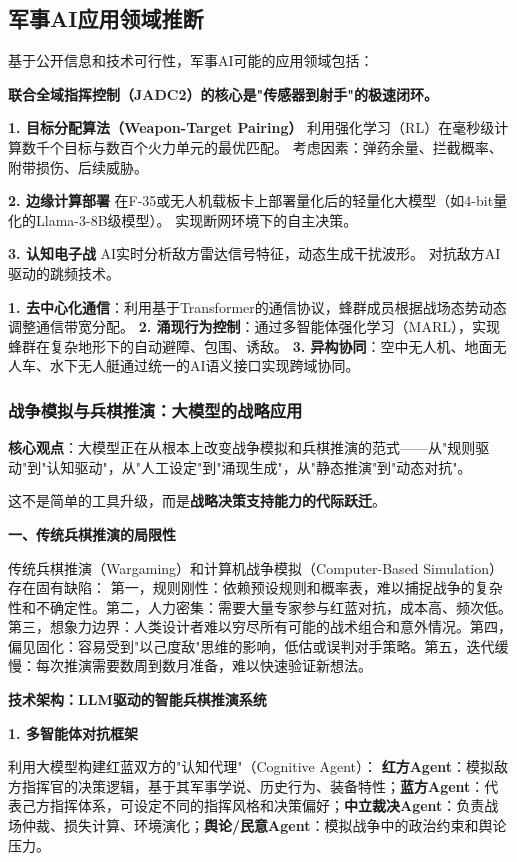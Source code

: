 \subsection{军事AI应用领域推断}

基于公开信息和技术可行性，军事AI可能的应用领域包括：

\textbf{联合全域指挥控制（JADC2）的核心是"传感器到射手"的极速闭环。}

\textbf{1. 目标分配算法（Weapon-Target Pairing）}
利用强化学习（RL）在毫秒级计算数千个目标与数百个火力单元的最优匹配。 考虑因素：弹药余量、拦截概率、附带损伤、后续威胁。

\textbf{2. 边缘计算部署}
在F-35或无人机载板卡上部署量化后的轻量化大模型（如4-bit量化的Llama-3-8B级模型）。 实现断网环境下的自主决策。

\textbf{3. 认知电子战}
AI实时分析敌方雷达信号特征，动态生成干扰波形。 对抗敌方AI驱动的跳频技术。

\textbf{1. 去中心化通信}：利用基于Transformer的通信协议，蜂群成员根据战场态势动态调整通信带宽分配。
\textbf{2. 涌现行为控制}：通过多智能体强化学习（MARL），实现蜂群在复杂地形下的自动避障、包围、诱敌。
\textbf{3. 异构协同}：空中无人机、地面无人车、水下无人艇通过统一的AI语义接口实现跨域协同。

\subsubsection{战争模拟与兵棋推演：大模型的战略应用}

\textbf{核心观点}：大模型正在从根本上改变战争模拟和兵棋推演的范式——从"规则驱动"到"认知驱动"，从"人工设定"到"涌现生成"，从"静态推演"到"动态对抗"。

这不是简单的工具升级，而是\textbf{战略决策支持能力的代际跃迁}。

\textbf{一、传统兵棋推演的局限性}

传统兵棋推演（Wargaming）和计算机战争模拟（Computer-Based Simulation）存在固有缺陷：
第一，规则刚性：依赖预设规则和概率表，难以捕捉战争的复杂性和不确定性。第二，人力密集：需要大量专家参与红蓝对抗，成本高、频次低。第三，想象力边界：人类设计者难以穷尽所有可能的战术组合和意外情况。第四，偏见固化：容易受到"以己度敌"思维的影响，低估或误判对手策略。第五，迭代缓慢：每次推演需要数周到数月准备，难以快速验证新想法。

\textbf{技术架构：LLM驱动的智能兵棋推演系统}

\textbf{1. 多智能体对抗框架}

利用大模型构建红蓝双方的"认知代理"（Cognitive Agent）：
\textbf{红方Agent}：模拟敌方指挥官的决策逻辑，基于其军事学说、历史行为、装备特性；\textbf{蓝方Agent}：代表己方指挥体系，可设定不同的指挥风格和决策偏好；\textbf{中立裁决Agent}：负责战场仲裁、损失计算、环境演化；\textbf{舆论/民意Agent}：模拟战争中的政治约束和舆论压力。

